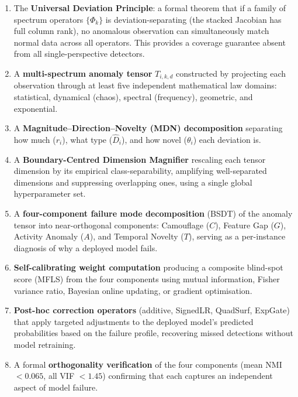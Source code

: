 \documentclass[12pt,a4paper]{article}
\begin{document}
\begin{enumerate}[label=(\roman*)]
\item The \textbf{Universal Deviation Principle}: a formal theorem that if
a family of spectrum operators $\{\Phi_k\}$ is deviation-separating (the
stacked Jacobian has full column rank), no anomalous observation can
simultaneously match normal data across all operators. This provides a
coverage guarantee absent from all single-perspective detectors.

\item A \textbf{multi-spectrum anomaly tensor} $T_{i,k,d}$ constructed by
projecting each observation through at least five independent mathematical
law domains: statistical, dynamical (chaos), spectral (frequency),
geometric, and exponential.

\item A \textbf{Magnitude--Direction--Novelty (MDN) decomposition}
separating how much ($r_i$), what type ($\hat{D}_i$), and how novel
($\theta_i$) each deviation is.

\item A \textbf{Boundary-Centred Dimension Magnifier} rescaling each
tensor dimension by its empirical class-separability, amplifying
well-separated dimensions and suppressing overlapping ones, using a
single global hyperparameter set.

\item A \textbf{four-component failure mode decomposition} (BSDT) of
the anomaly tensor into near-orthogonal components: Camouflage ($C$),
Feature Gap ($G$), Activity Anomaly ($A$), and Temporal Novelty ($T$),
serving as a per-instance diagnosis of why a deployed model fails.

\item \textbf{Self-calibrating weight computation} producing a composite
blind-spot score (MFLS) from the four components using mutual information,
Fisher variance ratio, Bayesian online updating, or gradient optimisation.

\item \textbf{Post-hoc correction operators} (additive, SignedLR,
QuadSurf, ExpGate) that apply targeted adjustments to the deployed model's
predicted probabilities based on the failure profile, recovering missed
detections without model retraining.

\item A formal \textbf{orthogonality verification} of the four components
(mean NMI $< 0.065$, all VIF $< 1.45$) confirming that each captures an
independent aspect of model failure.
\end{enumerate}
\end{document}
